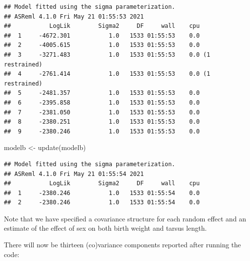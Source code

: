 \documentclass[
  12pt,
]{book}
\newenvironment{Shaded}{\begin{snugshade}}{\end{snugshade}}
\newcommand{\FunctionTok}[1]{\textcolor[rgb]{0.00,0.00,0.00}{#1}}
\newcommand{\NormalTok}[1]{#1}
\newcommand{\OtherTok}[1]{\textcolor[rgb]{0.56,0.35,0.01}{#1}}
\newcommand{\SpecialCharTok}[1]{\textcolor[rgb]{0.00,0.00,0.00}{#1}}
\begin{document}
\begin{verbatim}
## Model fitted using the sigma parameterization.
## ASReml 4.1.0 Fri May 21 01:55:53 2021
##           LogLik        Sigma2     DF     wall    cpu
##  1     -4672.301           1.0   1533 01:55:53    0.0
##  2     -4005.615           1.0   1533 01:55:53    0.0
##  3     -3271.483           1.0   1533 01:55:53    0.0 (1 restrained)
##  4     -2761.414           1.0   1533 01:55:53    0.0 (1 restrained)
##  5     -2481.357           1.0   1533 01:55:53    0.0
##  6     -2395.858           1.0   1533 01:55:53    0.0
##  7     -2381.050           1.0   1533 01:55:53    0.0
##  8     -2380.251           1.0   1533 01:55:53    0.0
##  9     -2380.246           1.0   1533 01:55:53    0.0
\end{verbatim}

\begin{Shaded}
\begin{Highlighting}[]
\NormalTok{modelb }\OtherTok{\textless{}{-}} \FunctionTok{update}\NormalTok{(modelb)}
\end{Highlighting}
\end{Shaded}

\begin{verbatim}
## Model fitted using the sigma parameterization.
## ASReml 4.1.0 Fri May 21 01:55:54 2021
##           LogLik        Sigma2     DF     wall    cpu
##  1     -2380.246           1.0   1533 01:55:54    0.0
##  2     -2380.246           1.0   1533 01:55:54    0.0
\end{verbatim}

Note that we have specified a covariance structure for each random effect and an estimate of the effect of sex on both birth weight and tarsus length.

There will now be thirteen (co)variance components reported after running the code:

\begin{Shaded}
\end{Shaded}
\end{document}
